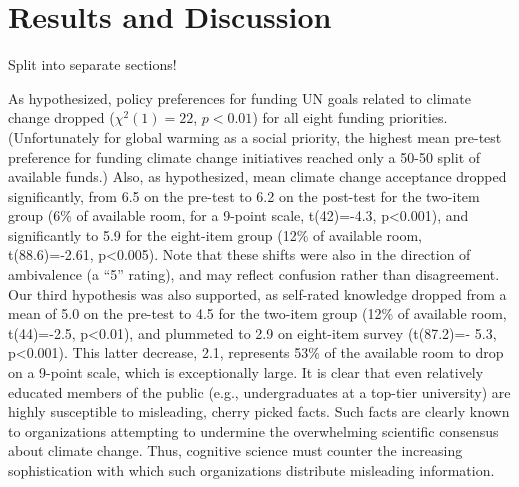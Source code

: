 \section{Results and Discussion}

Split into separate sections! 

As hypothesized, policy preferences for funding UN goals
related to climate change dropped ($\chi^2(1)=22$, $p<0.01$) for all eight funding
priorities. (Unfortunately for global warming as a social priority, the highest
mean pre-test preference for funding climate change initiatives reached only a
50-50 split of available funds.) Also, as hypothesized, mean climate change
acceptance dropped significantly, from 6.5 on the pre-test to 6.2 on the
post-test for the two-item group (6\% of available room, for a 9-point scale,
t(42)=-4.3, p<0.001), and significantly to 5.9 for the eight-item group (12\% of
available room, t(88.6)=‑2.61, p<0.005). Note that these shifts were also in the
direction of ambivalence (a ``5'' rating), and may reflect confusion rather than
disagreement. Our third hypothesis was also supported, as self-rated knowledge
dropped from a mean of 5.0 on the pre-test to 4.5 for the two-item group (12\% of
available room, t(44)=-2.5, p<0.01), and plummeted to 2.9 on eight-item survey
(t(87.2)=- 5.3, p<0.001). This latter decrease, 2.1, represents 53\% of the
available room to drop on a 9-point scale, which is exceptionally large.  It is
clear that even relatively educated members of the public (e.g., undergraduates
at a top-tier university) are highly susceptible to misleading, cherry picked
facts. Such facts are clearly known to organizations attempting to undermine the
overwhelming scientific consensus about climate change. Thus, cognitive science
must counter the increasing sophistication with which such organizations
distribute misleading information.

